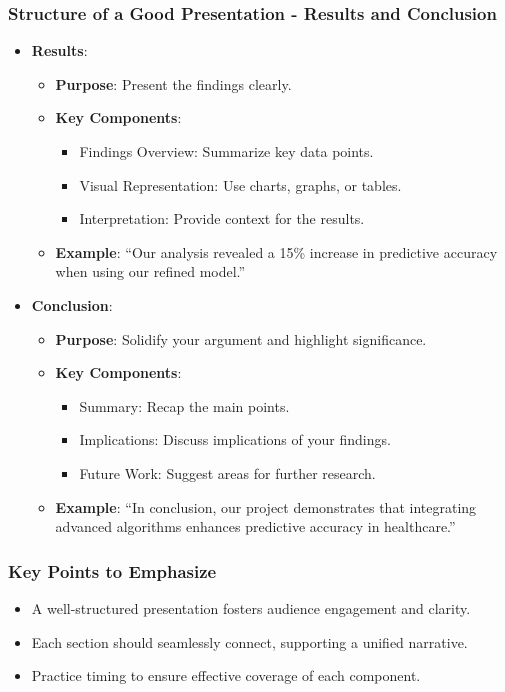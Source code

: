 \documentclass[aspectratio=169]{beamer}
\begin{document}
\begin{frame}[fragile]
    \frametitle{Structure of a Good Presentation - Results and Conclusion}
    \begin{itemize}
        \item \textbf{Results}:
        \begin{itemize}
            \item \textbf{Purpose}: Present the findings clearly.
            \item \textbf{Key Components}:
            \begin{itemize}
                \item Findings Overview: Summarize key data points.
                \item Visual Representation: Use charts, graphs, or tables.
                \item Interpretation: Provide context for the results.
            \end{itemize}
            \item \textbf{Example}:
            “Our analysis revealed a 15\% increase in predictive accuracy when using our refined model.”
        \end{itemize}
        
        \item \textbf{Conclusion}:
        \begin{itemize}
            \item \textbf{Purpose}: Solidify your argument and highlight significance.
            \item \textbf{Key Components}:
            \begin{itemize}
                \item Summary: Recap the main points.
                \item Implications: Discuss implications of your findings.
                \item Future Work: Suggest areas for further research.
            \end{itemize}
            \item \textbf{Example}:
            “In conclusion, our project demonstrates that integrating advanced algorithms enhances predictive accuracy in healthcare.”
        \end{itemize}
    \end{itemize}
\end{frame}

\begin{frame}[fragile]
    \frametitle{Key Points to Emphasize}
    \begin{itemize}
        \item A well-structured presentation fosters audience engagement and clarity.
        \item Each section should seamlessly connect, supporting a unified narrative.
        \item Practice timing to ensure effective coverage of each component.
    \end{itemize}
\end{frame}
\end{document}
